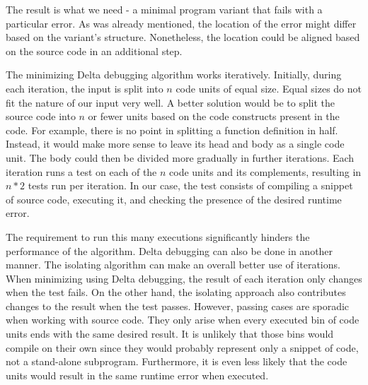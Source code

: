 The result is what we need - a minimal program variant that fails with 
a particular error.
As was already mentioned, the location of the error might differ based 
on the variant's structure.
Nonetheless, the location could be aligned based on the source code in 
an additional step.


The minimizing Delta debugging algorithm works iteratively.
Initially, during each iteration, the input is split into $n$ code units 
of equal size.
Equal sizes do not fit the nature of our input very well.
A better solution would be to split the source code into $n$ or fewer units 
based on the code constructs present in the code.
For example, there is no point in splitting a function definition in half.
Instead, it would make more sense to leave its head and body as a single 
code unit.
The body could then be divided more gradually in further iterations.
Each iteration runs a test on each of the $n$ code units and its 
complements, resulting in $n * 2$ tests run per iteration.
In our case, the test consists of compiling a snippet of 
source code, executing it, and checking the presence of the desired runtime
error.

The requirement to run this many executions significantly hinders 
the performance of the algorithm.
Delta debugging can also be done in another manner.
The isolating algorithm can make an overall better use of iterations.
When minimizing using Delta debugging, the result of each iteration 
only changes when the test fails.
On the other hand, the isolating approach also contributes changes 
to the result when the test passes.
However, passing cases are sporadic when working with source code.
They only arise when every executed bin of code units ends with the same 
desired result.
It is unlikely that those bins would compile on their own since 
they would probably represent only a snippet of code, not a stand-alone 
subprogram.
Furthermore, it is even less likely that the code units would result 
in the same runtime error when executed.



